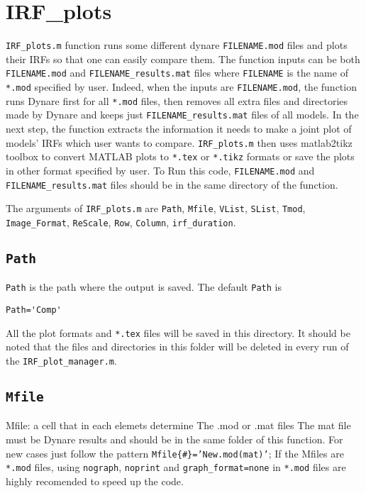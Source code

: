 \documentclass[11pt,a4paper]{article}
\begin{document}
\section{IRF\_plots}
\texttt{IRF\_plots.m} function runs some different dynare \texttt{FILENAME.mod} files and plots their IRFs so that one can easily compare them. The function inputs can be both \texttt{FILENAME.mod} and \texttt{FILENAME_results.mat} files where \texttt{FILENAME} is the name of \texttt{*.mod} specified by user. Indeed, when the inputs are \texttt{FILENAME.mod}, the function runs Dynare first for all \texttt{*.mod} files, then removes all extra files and directories made by Dynare and keeps just \texttt{FILENAME_results.mat} files of all models. In the next step, the function extracts the information it needs to make a joint plot of models' IRFs which user wants to compare. \texttt{IRF\_plots.m} then uses matlab2tikz toolbox to convert MATLAB plots to \texttt{*.tex} or \texttt{*.tikz} formats or save the plots in other format specified by user. To Run this code, \texttt{FILENAME.mod} and \texttt{FILENAME_results.mat} files should be in the same directory of the function.

The arguments of \texttt{IRF\_plots.m} are \texttt{Path}, \texttt{Mfile}, \texttt{VList}, \texttt{SList}, \texttt{Tmod}, \texttt{Image_Format}, \texttt{ReScale}, \texttt{Row},  \texttt{Column}, \texttt{irf\_duration}.

\subsection{\texttt{Path}}

\texttt{Path} is the path where the output is saved. The default \texttt{Path} is 

\begin{lstlisting} 
Path='Comp'
\end{lstlisting}

All the plot formats and \texttt{*.tex} files  will be saved in this directory. It should be noted that the files and directories in this folder will be deleted in every run of the \texttt{IRF\_plot\_manager.m}.

\subsection{\texttt{Mfile}}
Mfile: a cell that in each elemets determine The .mod or .mat files
The mat file must be Dynare results and should be
in the same folder of this function.
For new cases just follow the pattern \texttt{Mfile\{\#\}='New.mod(mat)'};
If the Mfiles are \texttt{*.mod} files, using \texttt{nograph}, \texttt{noprint} and 
\texttt{graph_format=none} in \texttt{*.mod} files are highly recomended to
speed up the code.
\end{document}
